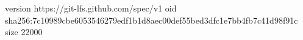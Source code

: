 version https://git-lfs.github.com/spec/v1
oid sha256:7c10989cbe6053546279edf1b1d8aec00def55bed3dfc1e7bb4fb7c41d98f91c
size 22000

